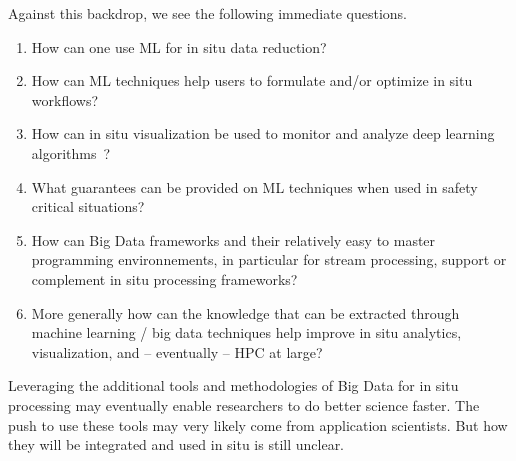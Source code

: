 \begin{refsection}

Against this backdrop, we see the following immediate questions.
\begin{enumerate}
    \item How can one use ML for in situ data reduction?
    \item How can ML techniques help users to formulate and/or optimize in situ workflows? 
    \item How can in situ visualization be used to monitor and analyze deep learning algorithms~\cite{Strobelt16}?
    \item What guarantees can be provided on ML techniques when used in safety critical situations?
    \item How can Big Data frameworks and their relatively easy to master programming environnements, in particular for stream processing, support or complement in situ processing frameworks?
    \item More generally how can the knowledge that can be extracted through  machine learning / big data techniques help improve in situ analytics, visualization, and -- eventually -- HPC at large? 
\end{enumerate}
     
 \noindent 
Leveraging the additional tools and methodologies of  Big Data for in situ processing  may eventually enable researchers to do better science faster.  
The push to use these tools may very likely come from application scientists.
But how they will be integrated and used in situ is still unclear. 

\printbibliography
\end{refsection}

